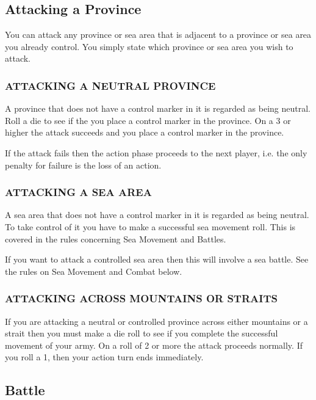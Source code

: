 \subsection{Attacking a Province}

You can attack any province or sea area that is adjacent to a province or sea area you already control. You simply state which province or sea area you wish to attack.

\subsubsection{ATTACKING A NEUTRAL PROVINCE}

A province that does not have a control marker in it is regarded as being neutral. Roll a die to see if the you place a control marker in the province. On a 3 or higher the attack succeeds and you place a control marker in the province.

If the attack fails then the action phase proceeds to the next player, i.e. the only penalty for failure is the loss of an action.

\subsubsection{ATTACKING A SEA AREA}

A sea area that does not have a control marker in it is regarded as being neutral. To take control of it you have to make a successful sea movement roll. This is covered in the rules concerning Sea Movement and Battles.

If you want to attack a controlled sea area then this will involve a sea battle. See the rules on Sea Movement and Combat below.

\subsubsection{ATTACKING ACROSS MOUNTAINS OR STRAITS}

If you are attacking a neutral or controlled province across either mountains or a strait then you must make a die roll to see if you complete the successful movement of your army. On a roll of 2 or more the attack proceeds normally. If you roll a 1, then your action turn ends immediately.

\subsection{Battle}

